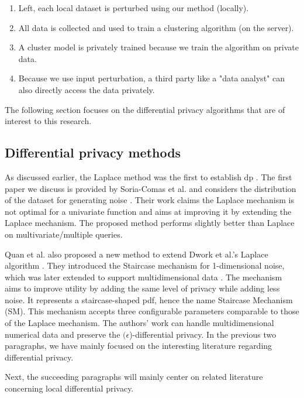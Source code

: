 \begin{enumerate}
  \item Left, each local dataset is perturbed using our method (locally).
  \item All data is collected and used to train a clustering algorithm (on the server).
  \item A cluster model is privately trained because we train the algorithm on private data.
  \item Because we use input perturbation, a third party like a "data analyst" can also directly access the data privately.
\end{enumerate}
The following section focuses on the differential privacy algorithms that are of interest to this research.

\newpage
\subsection{Differential privacy methods}
As discussed earlier, the Laplace method was the first to establish \gls{dp} \citep{dwork_differential_2006}.
The first paper we discuss is provided by Soria-Comas et al. and considers the distribution of the dataset for generating noise \citep{soria-comas_optimal_2013}.
Their work claims the Laplace mechanism is not optimal for a univariate function and aims at improving it by extending the Laplace mechanism.
The proposed method performs slightly better than Laplace on multivariate/multiple queries.

Quan et al. also proposed a new method to extend Dwork et al.'s Laplace algorithm \citep{geng_staircase_2015}.
They introduced the Staircase mechanism for 1-dimensional noise, which was later extended to support multidimensional data \citep{geng_staircase_2015}.
The mechanism aims to improve utility by adding the same level of privacy while adding less noise.
It represents a staircase-shaped \gls{pdf}, hence the name Staircase Mechanism (SM).
This mechanism accepts three configurable parameters comparable to those of the Laplace mechanism.
The authors' work can handle multidimensional numerical data and preserve the  $(\epsilon$)-differential privacy.
In the previous two paragraphs, we have mainly focused on the interesting literature regarding differential privacy.

Next, the succeeding paragraphs will mainly center on related literature concerning local differential privacy.

